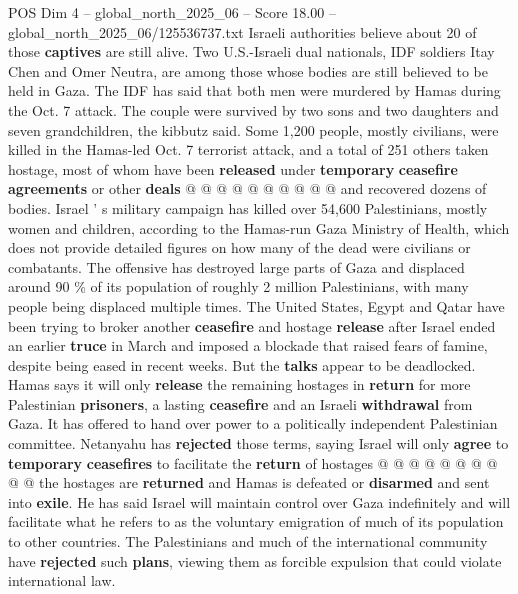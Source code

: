 \begin{textsample}{POS Dim 4 – global\_north\_2025\_06 – Score 18.00 – global\_north\_2025\_06/125536737.txt}
Israeli authorities believe about 20 of those \textbf{captives} are still alive.
Two U.S.-Israeli dual nationals, IDF soldiers Itay Chen and Omer Neutra, are among those whose bodies are still believed to be held in Gaza.
The IDF has said that both men were murdered by Hamas during the Oct. 7 attack.
The couple were survived by two sons and two daughters and seven grandchildren, the kibbutz said.
Some 1,200 people, mostly civilians, were killed in the Hamas-led Oct. 7 terrorist attack, and a total of 251 others taken hostage, most of whom have been \textbf{released} under \textbf{temporary} \textbf{ceasefire} \textbf{agreements} or other \textbf{deals} @ @ @ @ @ @ @ @ @ @ and recovered dozens of bodies.
Israel ' s military campaign has killed over 54,600 Palestinians, mostly women and children, according to the Hamas-run Gaza Ministry of Health, which does not provide detailed figures on how many of the dead were civilians or combatants.
The offensive has destroyed large parts of Gaza and displaced around 90 \% of its population of roughly 2 million Palestinians, with many people being displaced multiple times.
The United States, Egypt and Qatar have been trying to broker another \textbf{ceasefire} and hostage \textbf{release} after Israel ended an earlier \textbf{truce} in March and imposed a blockade that raised fears of famine, despite being eased in recent weeks.
But the \textbf{talks} appear to be deadlocked.
Hamas says it will only \textbf{release} the remaining hostages in \textbf{return} for more Palestinian \textbf{prisoners}, a lasting \textbf{ceasefire} and an Israeli \textbf{withdrawal} from Gaza.
It has offered to hand over power to a politically independent Palestinian committee.
Netanyahu has \textbf{rejected} those terms, saying Israel will only \textbf{agree} to \textbf{temporary} \textbf{ceasefires} to facilitate the \textbf{return} of hostages @ @ @ @ @ @ @ @ @ @ the hostages are \textbf{returned} and Hamas is defeated or \textbf{disarmed} and sent into \textbf{exile}.
He has said Israel will maintain control over Gaza indefinitely and will facilitate what he refers to as the voluntary emigration of much of its population to other countries.
The Palestinians and much of the international community have \textbf{rejected} such \textbf{plans}, viewing them as forcible expulsion that could violate international law.

\end{textsample}
